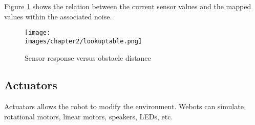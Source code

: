 Figure \ref{fig:ch-2:lookup} shows the relation between the current sensor values and the mapped values within the associated noise.

\begin{figure}[h!]
  \centering
  \texttt{[image: \\images/chapter2/lookuptable.png]}
  \caption{Sensor response versus obstacle distance}
  \label{fig:ch-2:lookup}
\end{figure}

\subsection{Actuators}

Actuators allows the robot to modify the environment. Webots can simulate rotational motors, linear motors, speakers, LEDs, etc. 
